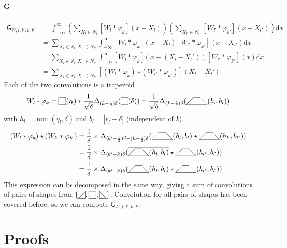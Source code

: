 \documentclass[a4paper,10pt]{article}
\newcommand\Shifted[2]{\Delta_{#1}(#2)}
\newcommand\Reversed[1]{\overline{#1}} %
\newcommand\SymSquare{\begin{tikzpicture}[baseline=0.5ex]%
        \draw (0,0) -- (0,1em) -- (1em,1em) -- (1em,0) -- cycle;
\end{tikzpicture}}
\newcommand\Indicator[1]{\SymSquare(#1)}
\newcommand\SymPositiveTriangle{\begin{tikzpicture}[baseline=0.5ex]%
        \draw (0,0) -- (1em,0em) -- (1em,1em) -- cycle;
\end{tikzpicture}}
\newcommand\SymNegativeTriangle{\begin{tikzpicture}[baseline=0.5ex]%
        \draw (0,0) -- (0,1em) -- (1em,0em) -- cycle;
\end{tikzpicture}}
\newcommand\SymTrapezoid{\begin{tikzpicture}[baseline=0.5ex]%
        \draw (0,0) -- (3em,0) -- (2em,1em) -- (1em,1em) -- cycle;
\end{tikzpicture}}
\newcommand\Trapezoid[2]{\SymTrapezoid(#1,#2)}%
\newcommand\D{\mathrm{d}}
\newcommand\Convolution{\ast}
\newcommand\Correlation{\star}
\newcommand\IntR[2]{\int_{-\infty}^{\infty}#1 \D#2}
\begin{document}
\paragraph{G}
\[ \begin{split}
    \mathsf{G}_{W,l,l',k,k'} & = \IntR{\left( \sum_{X_l \in N_l} [W_l \Convolution \varphi_k](x-X_l) \right)\left( \sum_{X_{l'} \in N_{l'}} [W_{l'} \Convolution \varphi_{k'}](x-X_{l'}) \right)}{x} \\
    & = \sum_{X_l \in N_l, X_{l'} \in N_{l'}} \IntR{ [W_l \Convolution \varphi_k](x-X_l) [W_{l'} \Convolution \varphi_{k'}](x-X_{l'}) }{x} \\
    & = \sum_{X_l \in N_l, X_{l'} \in N_{l'}} \IntR{ [W_l \Convolution \varphi_k](x-(X_l-X_l')) [W_{l'} \Convolution \varphi_{k'}](x) }{x} \\
    & = \sum_{X_l \in N_l, X_{l'} \in N_{l'}} [(W_l \Convolution \varphi_k) \Correlation (W_{l'} \Convolution \varphi_{k'})] (X_l-X_l')
\end{split} \]
Each of the two convolutions is a trapezoid
\[
    W_l \Convolution \varphi_k =
    \Indicator{\eta_l} \Convolution \frac{1}{\sqrt{\delta}} \Shifted{(k-\frac{1}{2})\delta}{\Indicator{\delta}} =
    \frac{1}{\sqrt{\delta}} \Shifted{(k-\frac{1}{2})\delta}{\Trapezoid{h_l}{b_l}}
\]
with $h_l = \min(\eta_l,\delta)$ and $b_l = |\eta_l - \delta|$ (independent of $k$).
\[ \begin{split}
    (W_l \Convolution \varphi_k) \Correlation (W_{l'} \Convolution \varphi_{k'})
    & = \frac{1}{\delta} \times \Shifted{(k'-\frac{1}{2})\delta - (k-\frac{1}{2})\delta}{\Trapezoid{h_l}{b_l} \Correlation \Trapezoid{h_{l'}}{b_{l'}}} \\
    &= \frac{1}{\delta} \times \Shifted{(k'-k)\delta}{\Reversed{\Trapezoid{h_l}{b_l}} \Correlation \Trapezoid{h_{l'}}{b_{l'}}} \\
    &= \frac{1}{\delta} \times \Shifted{(k'-k)\delta}{\Trapezoid{h_l}{b_l} \Convolution \Trapezoid{h_{l'}}{b_{l'}}}
\end{split} \]
This expression can be decomposed in the same way, giving a sum of convolutions of pairs of shapes from $\{\SymPositiveTriangle, \SymSquare, \SymNegativeTriangle \}$.
Convolution for all pairs of shapes has been covered before, so we can compute $\mathsf{G}_{W,l,l',k,k'}$.

\section{Proofs}
\end{document}
